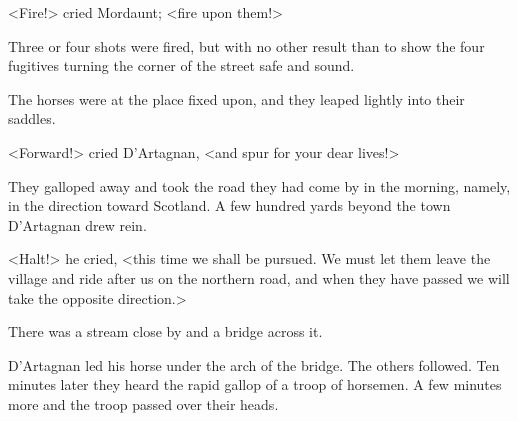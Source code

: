 <Fire!> cried Mordaunt; <fire upon them!>

Three or four shots were fired, but with no other result than to show the four fugitives turning the corner of the street safe and sound.

The horses were at the place fixed upon, and they leaped lightly into their saddles.

<Forward!> cried D'Artagnan, <and spur for your dear lives!>

They galloped away and took the road they had come by in the morning, namely, in the direction toward Scotland. A few hundred yards beyond the town D'Artagnan drew rein.

<Halt!> he cried, <this time we shall be pursued. We must let them leave the village and ride after us on the northern road, and when they have passed we will take the opposite direction.>

There was a stream close by and a bridge across it.

D'Artagnan led his horse under the arch of the bridge. The others followed. Ten minutes later they heard the rapid gallop of a troop of horsemen. A few minutes more and the troop passed over their heads. 